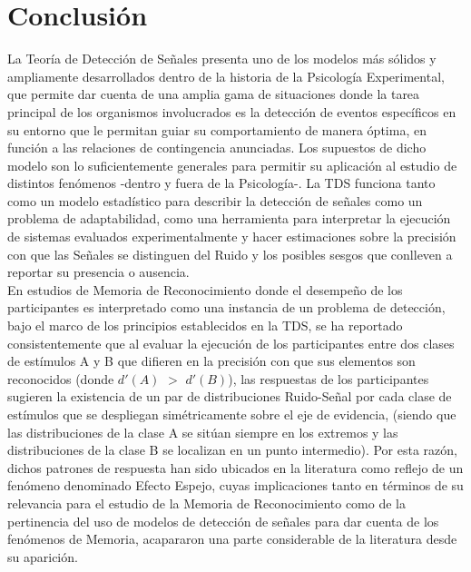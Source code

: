 
\chapter{Conclusión} %

\label{Cap_Conclusion} %

La Teoría de Detección de Señales presenta uno de los modelos más sólidos y ampliamente desarrollados dentro de la historia de la Psicología Experimental, que permite dar cuenta de una amplia gama de situaciones donde la tarea principal de los organismos involucrados es la detección de eventos específicos en su entorno que le permitan guiar su comportamiento de manera óptima, en función a las relaciones de contingencia anunciadas. Los supuestos de dicho modelo son lo suficientemente generales para permitir su aplicación al estudio de distintos fenómenos -dentro y fuera de la Psicología-. La TDS funciona tanto como un modelo estadístico para describir la detección de señales como un problema de adaptabilidad, como una herramienta para interpretar la ejecución de sistemas evaluados experimentalmente y hacer estimaciones sobre la precisión con que las Señales se distinguen del Ruido y los posibles sesgos que conlleven a reportar su presencia o ausencia.\\

En estudios de Memoria de Reconocimiento donde el desempeño de los participantes es interpretado como una instancia de un problema de detección, bajo el marco de los principios establecidos en la TDS, se ha reportado consistentemente que al evaluar la ejecución de los participantes entre dos clases de estímulos A y B que difieren en la precisión con que sus elementos son reconocidos (donde $d'(A)$ $>$ $d'(B)$), las respuestas de los participantes sugieren la existencia de un par de distribuciones Ruido-Señal por cada clase de estímulos que se despliegan simétricamente sobre el eje de evidencia, (siendo que las distribuciones de la clase A se sitúan siempre en los extremos y las distribuciones de la clase B se localizan en un punto intermedio). Por esta razón, dichos patrones de respuesta han sido ubicados en la literatura como reflejo de un fenómeno denominado Efecto Espejo, cuyas implicaciones tanto en términos de su relevancia para el estudio de la Memoria de Reconocimiento como de la pertinencia del uso de modelos de detección de señales para dar cuenta de los fenómenos de Memoria, acapararon una parte considerable de la literatura desde su aparición.\\

